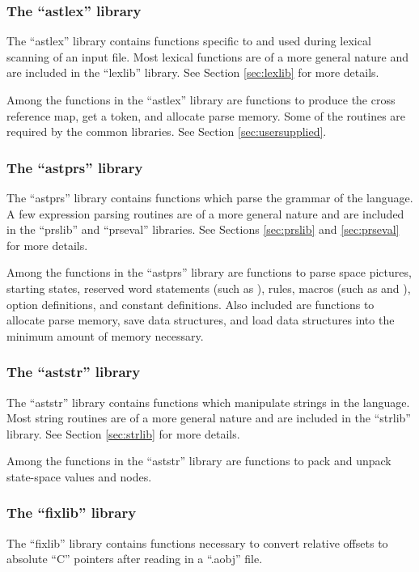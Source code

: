 \subsubsection{The ``astlex'' library}
\label{sec:astlex}
The ``astlex'' library contains functions specific to
 and used during lexical scanning
of an input file.   Most lexical functions are of a more general nature
and are included in the ``lexlib'' library.
See Section \ref{sec:lexlib} for more details.

Among the functions in the ``astlex'' library are functions to produce
the cross reference map, get a token, and allocate parse memory.
Some of the routines are required by the common libraries.
See Section \ref{sec:usersupplied}.

\subsubsection{The ``astprs'' library}
\label{sec:astprs}
The ``astprs'' library contains functions which parse the grammar of the
 language.   A few expression parsing routines are of a
more general nature and are included in the ``prslib'' and ``prseval''
libraries.  See Sections \ref{sec:prslib} and \ref{sec:prseval} for
more details.

Among the functions in the ``astprs'' library are functions to
parse space pictures, starting states,
reserved word statements (such as ),
rules, macros (such as  and ),
option definitions, and constant definitions.
Also included are functions to allocate parse memory, save data structures,
and load data structures into the minimum amount of memory necessary.

\subsubsection{The ``aststr'' library}
\label{sec:aststr}
The ``aststr'' library contains functions which manipulate strings in the
 language.   Most string routines are of a
more general nature and are included in the ``strlib'' library.
See Section \ref{sec:strlib} for more details.

Among the functions in the ``aststr'' library are functions to
pack and unpack state-space values and nodes.

\subsubsection{The ``fixlib'' library}
\label{sec:fixlib}
The ``fixlib'' library contains functions necessary to convert relative
offsets to absolute ``C'' pointers after reading in a ``.aobj'' file.

